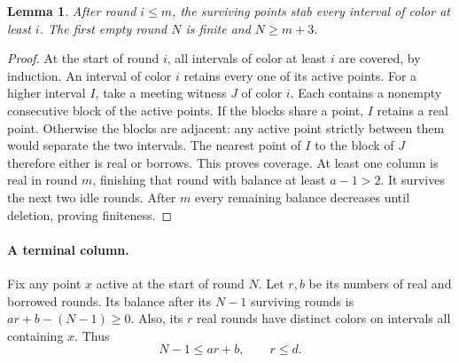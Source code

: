 \documentclass[11pt]{article}
\newtheorem{lemma}[theorem]{Lemma}
\begin{document}
\begin{lemma}
After round $i\le m$, the surviving points stab every interval of color
at least $i$. The first empty round $N$ is finite and $N\ge m+3$.
\end{lemma}
\begin{proof}
At the start of round $i$, all intervals of color at least $i$ are
covered, by induction. An interval of color $i$ retains every one of its
active points. For a higher interval $I$, take a meeting witness $J$ of
color $i$. Each contains a nonempty consecutive block of the active
points. If the blocks share a point, $I$ retains a real point. Otherwise
the blocks are adjacent: any active point strictly between them would
separate the two intervals. The nearest point of $I$ to the block of $J$
therefore either is real or borrows. This proves coverage. At least one
column is real in round $m$, finishing that round with balance at least
$a-1>2$. It survives the next two idle rounds. After $m$ every remaining
balance decreases until deletion, proving finiteness.
\end{proof}

\paragraph{A terminal column.}
Fix any point $x$ active at the start of round $N$. Let $r,b$ be its
numbers of real and borrowed rounds. Its balance after its $N-1$
surviving rounds is $ar+b-(N-1)\ge0$. Also, its $r$ real rounds have
distinct colors on intervals all containing $x$. Thus
\begin{equation}
 N-1\le ar+b,\qquad r\le d. \label{own}
\end{equation}
\end{document}
